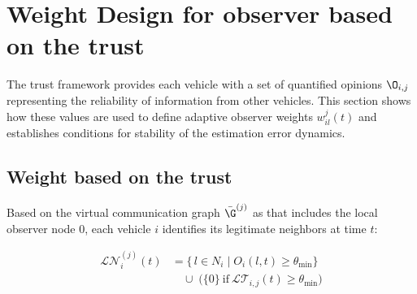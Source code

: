 \section{Weight Design for observer based on the trust}\label{sec_Weigth_Design}
The trust framework provides each vehicle with a set of quantified opinions $\O_{i,j}$ representing the reliability of information from other vehicles.
This section shows how these values are used to define adaptive observer weights $w_{il}^{j}(t)$ and establishes conditions for stability of the estimation error dynamics.

\subsection{Weight based on the trust}
Based on the virtual communication graph $\bar{\G}^{{(j)}}$ as that includes the local observer node 0, each vehicle $i$ identifies its legitimate neighbors at time $t$: 



\begin{align}
\mathcal{LN}^{(j)}_{i}(t)
&= \Big\{\, l \in N_i \;\big|\; O_i(l,t) \ge \theta_{\min} \Big\} \nonumber \\
&\quad \cup\;
\Big( \{0\}\ \text{if}\ \mathcal{LT}_{i,j}(t) \ge \theta_{\min} \Big)
\end{align}



